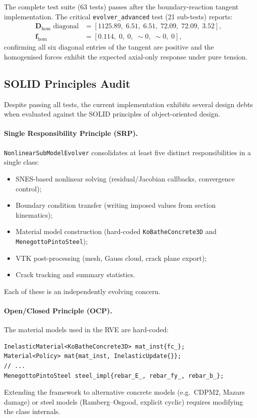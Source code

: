 The complete test suite (63 tests) passes after the
boundary-reaction tangent implementation.  The critical
\texttt{evolver\_advanced} test (21 sub-tests) reports:
\begin{align*}
  \mathbf{D}_{\text{hom}} \text{ diagonal}
    &= [1125.89, \; 6.51, \; 6.51, \; 72.09, \; 72.09, \; 3.52], \\
  \mathbf{f}_{\text{hom}}
    &= [0.114, \; 0, \; 0, \; {\sim}0, \; {\sim}0, \; 0],
\end{align*}
confirming all six diagonal entries of the tangent are positive and
the homogenised forces exhibit the expected axial-only response
under pure tension.

\subsection{SOLID Principles Audit}
\label{sec:ms-solid-audit}

Despite passing all tests, the current implementation exhibits several
design debts when evaluated against the SOLID principles of
object-oriented design.

\paragraph{Single Responsibility Principle (SRP).}
\texttt{NonlinearSubModelEvolver} consolidates at least five distinct
responsibilities in a single class:
\begin{itemize}
  \item SNES-based nonlinear solving (residual/Jacobian callbacks,
    convergence control);
  \item Boundary condition transfer (writing imposed values from
    section kinematics);
  \item Material model construction (hard-coded
    \texttt{KoBatheConcrete3D} and \texttt{MenegottoPintoSteel});
  \item VTK post-processing (mesh, Gauss cloud, crack plane export);
  \item Crack tracking and summary statistics.
\end{itemize}
Each of these is an independently evolving concern.

\paragraph{Open/Closed Principle (OCP).}
The material models used in the RVE are hard-coded:
\begin{lstlisting}[caption={Hard-coded material in \texttt{first\_solve()}.}]
InelasticMaterial<KoBatheConcrete3D> mat_inst{fc_};
Material<Policy> mat{mat_inst, InelasticUpdate{}};
// ...
MenegottoPintoSteel steel_impl{rebar_E_, rebar_fy_, rebar_b_};
\end{lstlisting}
Extending the framework to alternative concrete models (e.g.\ CDPM2,
Mazars damage) or steel models (Ramberg--Osgood, explicit cyclic)
requires modifying the class internals.

